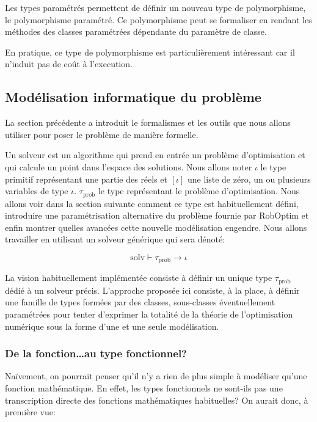 Les types paramétrés permettent de définir un nouveau type de
polymorphisme, le polymorphisme
paramétré. Ce
polymorphisme peut se formaliser en rendant les méthodes des classes
paramétrées dépendante du paramètre de classe.

En pratique, ce type de polymorphisme est particulièrement intéressant
car il n'induit pas de coût à l'execution.


\subsection{Modélisation informatique du problème}

La section précédente a introduit le formalismes et les outils que
nous allons utiliser pour poser le problème de manière formelle.


Un solveur est un algorithme qui prend en entrée un problème
d'optimisation et qui calcule un point dans l'espace des solutions.
Nous allons noter $\iota$ le type primitif représentant une partie des
réels et $[\iota]$ une liste de zéro, un ou plusieurs variables de
type $\iota$. $\tau_{\text{prob}}$ le type représentant le problème
d'optimisation. Nous allons voir dans la section suivante comment ce
type est habituellement défini, introduire une paramétrisation
alternative du problème fournie par RobOptim et enfin montrer quelles
avancées cette nouvelle modélisation engendre.  Nous allons travailler
en utilisant un solveur générique qui sera dénoté:


\begin{equation}
  \text{solv} \vdash \tau_{\text{prob}} \rightarrow \iota
\end{equation}


La vision habituellement implémentée consiste à définir un unique type
$\tau_{\text{prob}}$ dédié à un solveur précis. L'approche proposée
ici consiste, à la place, à définir une famille de types formées par
des classes, sous-classes éventuellement paramétrées pour tenter
d'exprimer la totalité de la théorie de l'optimisation numérique sous
la forme d'une et une seule modélisation.


\subsubsection{De la fonction\ldots au type fonctionnel?}


Naïvement, on pourrait penser qu'il n'y a rien de plus simple à
modéliser qu'une fonction mathématique. En effet, les types
fonctionnels ne sont-ils pas une transcription directe des fonctions
mathématiques habituelles? On aurait donc, à première vue:

